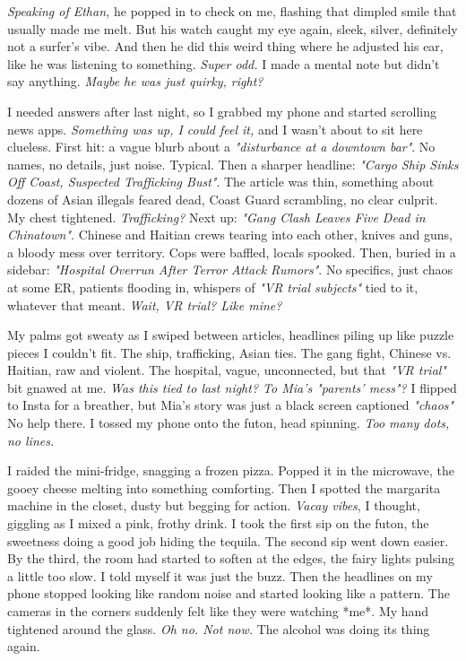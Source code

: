 \documentclass[12pt,oneside]{book}
\begin{document}
\textit{Speaking of Ethan,} he popped in to check on me, flashing that dimpled smile that usually made me melt. But his watch caught my eye again, sleek, silver, definitely not a surfer’s vibe. And then he did this weird thing where he adjusted his ear, like he was listening to something. \textit{Super odd.} I made a mental note but didn’t say anything. \textit{Maybe he was just quirky, right?}

I needed answers after last night, so I grabbed my phone and started scrolling news apps. \textit{Something was up, I could feel it,} and I wasn’t about to sit here clueless. First hit: a vague blurb about a \textit{"disturbance at a downtown bar"}. No names, no details, just noise. Typical. Then a sharper headline: \textit{"Cargo Ship Sinks Off Coast, Suspected Trafficking Bust"}. The article was thin, something about dozens of Asian illegals feared dead, Coast Guard scrambling, no clear culprit. My chest tightened. \textit{Trafficking?} Next up: \textit{"Gang Clash Leaves Five Dead in Chinatown"}. Chinese and Haitian crews tearing into each other, knives and guns, a bloody mess over territory. Cops were baffled, locals spooked. Then, buried in a sidebar: \textit{"Hospital Overrun After Terror Attack Rumors"}. No specifics, just chaos at some ER, patients flooding in, whispers of \textit{"VR trial subjects"} tied to it, whatever that meant. \textit{Wait, VR trial? Like mine?}

My palms got sweaty as I swiped between articles, headlines piling up like puzzle pieces I couldn’t fit. The ship, trafficking, Asian ties. The gang fight, Chinese vs. Haitian, raw and violent. The hospital, vague, unconnected, but that \textit{"VR trial"} bit gnawed at me. \textit{Was this tied to last night? To Mia’s "parents’ mess"?} I flipped to Insta for a breather, but Mia’s story was just a black screen captioned \textit{"chaos"} No help there. I tossed my phone onto the futon, head spinning. \textit{Too many dots, no lines.}

I raided the mini-fridge, snagging a frozen pizza. Popped it in the microwave, the gooey cheese melting into something comforting. Then I spotted the margarita machine in the closet, dusty but begging for action. \textit{Vacay vibes}, I thought, giggling as I mixed a pink, frothy drink. I took the first sip on the futon, the sweetness doing a good job hiding the tequila. The second sip went down easier. By the third, the room had started to soften at the edges, the fairy lights pulsing a little too slow. I told myself it was just the buzz. Then the headlines on my phone stopped looking like random noise and started looking like a pattern. The cameras in the corners suddenly felt like they were watching *me*. My hand tightened around the glass. \textit{Oh no. Not now.} The alcohol was doing its thing again.
\end{document}
